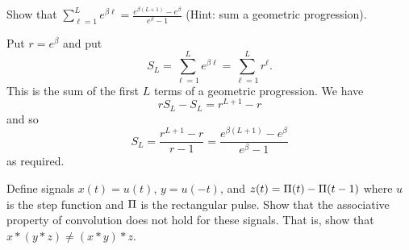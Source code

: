 \begin{excersizelist}
\begin{solution}
\begin{center}
\begin{tikzpicture}
  \end{tikzpicture}
\end{center}


\end{solution}

\item \label{excer:sumgeomeebeta} Show that $\sum_{\ell = 1}^L e^{\beta \ell} = \frac{e^{\beta (L+1)} - e^\beta}{e^\beta - 1}$  (Hint: sum a geometric progression).
\begin{solution}
Put $r = e^\beta$ and put
\[
S_L = \sum_{\ell = 1}^L e^{\beta \ell} = \sum_{\ell = 1}^L r^\ell.
\]
This is the sum of the first $L$ terms of a geometric progression.  We have
\[
r S_L - S_L = r^{L+1} - r
\]
and so
\[
S_L = \frac{r^{L+1} - r}{r - 1} =  \frac{e^{\beta (L+1)} - e^\beta}{e^\beta - 1}
\]
as required.
\end{solution}

\item Define signals $x(t) = u(t)$, $y = u(-t)$, and $z(t) = \rect(t) - \rect(t-1)$ where $u$ is the step function and $\rect$ is the rectangular pulse.  Show that the associative property of convolution does not hold for these signals.  That is, show that $x*(y*z) \neq (x*y)*z$.


\end{excersizelist}
